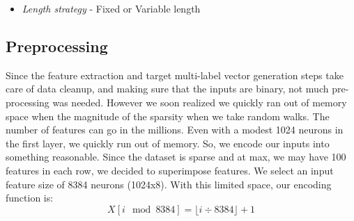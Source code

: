 \documentclass[runningheads,a4paper]{IEEEtran}
\begin{document}
\begin{itemize}
\begin{itemize}
\begin{figure}[t]
\begin{lstlisting}[language=Python,basicstyle=\tiny, frame=single]
Examples for Aristotle: 
	Features: (upto 5 of 20)
		influences<-author<-
		mainInterests<-placeOfBirth->
		influences<-influences->
		deathDate->birthPlace<-
		influences<-influenced<-
\end{lstlisting}
\caption{Examples of Features of \texttt{Move} Step Category of Walks of Length 2}
\label{stepExamples}
\end{figure} 
   \item \texttt{Both:} All four types of steps can be performed - attribute, relationship, and incoming relationship presence or step on an outgoing or incoming relationship. (see Figure~\ref{bothExamples} for examples), OR
\begin{figure}[t]
\begin{lstlisting}[language=Python,basicstyle=\tiny, frame=single]
Examples for United_States: 
	Features: (upto 5 of 124)
		hasInRel_institution,nationality<-
		hasInRel_production,hasInRel_restingPlace
		hasInRel_firstAired,hasInRel_releaseDate
		hasInRel_ideology,region<-
		hasInRel_manufacturer,hasInRel_subdivisionName

Examples for Washington__D_C_: 
	Features: (upto 5 of 122)
		hasInRel_governingBody,campus<-
		placeOfBirth<-birthPlace->
		hasInRel_residence,areaServed<-
		hasInRel_beltwayCity,hasInRel_city
		hasInRel_currentowner,birthDate<-

Examples for Aristotle: 
	Features: (upto 5 of 74)
		influences->has_name
		has_deathDate
		hasRel_influences,has_mainInterests
		has_deathDate,deathDate->
		hasInRel_influences,hasRel_deathDate
\end{lstlisting}
\caption{Examples of Features of \texttt{Both} Step Category of Walks of Length 2}
\label{bothExamples}
\end{figure} 
   \end{itemize} 
\item \textit{Length strategy} - Fixed or Variable length
\end{itemize}


\subsection{Preprocessing}
Since the feature extraction and target multi-label vector generation steps take care of data cleanup, and making sure that the inputs are binary, not much pre-processing was needed.
However we soon realized we quickly ran out of memory space when the magnitude of the sparsity when we take random walks. The number of features can go in the millions. Even with a modest 1024 neurons in the first layer, we quickly run out of memory. So, we encode our inputs into something reasonable. 
Since the dataset is sparse and at max, we may have 100 features in each row, we decided to superimpose features. We select an input feature size of 8384 neurons (1024x8). With this limited space, our encoding function is:
\[X[i \mod 8384]= \lfloor i \div 8384 \rfloor + 1  \]
\end{document}
